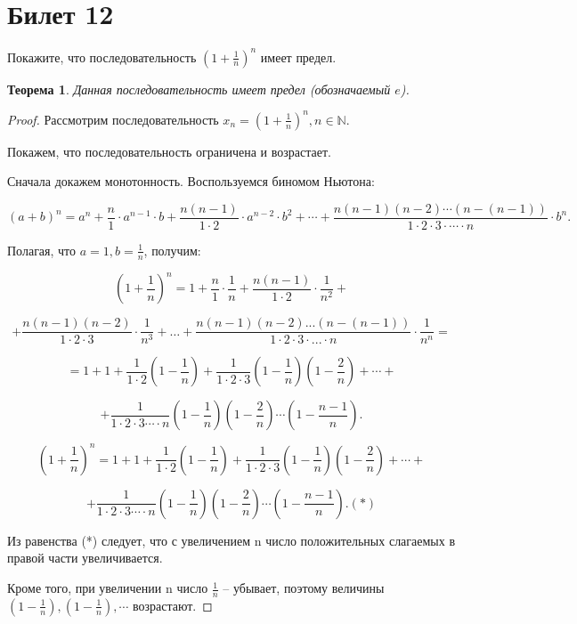 \documentclass[a4paper,12pt]{article}
\newtheorem*{ther}{Теорема}
\begin{document}
    \section*{Билет 12}

    Покажите, что последовательность $(1 + \frac{1}{n})^n$ имеет предел.

    \begin{ther}
        Данная последовательность имеет предел (обозначаемый $e$).
    \end{ther}

    \begin{proof}
            Рассмотрим последовательность $x_n= (1+\frac{1}{n})^n, n \in \mathbb{N}$.

            Покажем, что последовательность ограничена и возрастает.

            Сначала докажем монотонность. Воспользуемся биномом Ньютона:

            $$(a+b)^n= a^{n}+\frac{n}{1}\cdot a^{n-1}\cdot b+\frac{n (n-1)}{1\cdot 2}\cdot a^{n-2}\cdot b^{2}+ \cdots +\frac{n (n-1) (n-2)\cdots (n- (n-1))}{1\cdot 2\cdot 3\cdot \cdots \cdot n}\cdot b^{n}.$$

            Полагая, что  $a= 1, b= \frac{1}{n}$,  получим:

            $$(1+\frac{1}{n})^{n}= 1+\frac{n}{1}\cdot \frac{1}{n}+\frac{n (n-1)}{1\cdot 2}\cdot \frac{1}{n^{2}}+$$

            $$+\frac{n (n-1) (n-2)}{1\cdot 2\cdot 3}\cdot \frac{1}{n^{3}}+ \ldots + \frac{n (n-1) (n-2)... (n- (n-1))}{1\cdot 2\cdot 3\cdot ...\cdot n}\cdot \frac{1}{n^{n}}= $$

            $$= 1+1+\frac{1}{1\cdot 2} (1-\frac{1}{n})+\frac{1}{1\cdot 2\cdot 3} (1-\frac{1}{n}) (1-\frac{2}{n})+\cdots + $$

            $$+\frac{1}{1\cdot 2\cdot 3\cdots \cdot n} (1-\frac{1}{n}) (1-\frac{2}{n})\cdots (1-\frac{n-1}{n}).$$

            $$(1+\frac{1}{n})^{n}= 1+1+\frac{1}{1\cdot 2} (1-\frac{1}{n})+\frac{1}{1\cdot 2\cdot 3} (1-\frac{1}{n}) (1-\frac{2}{n})+ \cdots + $$

            $$+ \frac{1}{1\cdot 2\cdot 3\cdots\cdot n} (1-\frac{1}{n}) (1-\frac{2}{n})\cdots (1-\frac{n-1}{n}). (*)$$

            Из равенства (*) следует, что с увеличением n  число положительных слагаемых в правой части увеличивается.

            Кроме того, при увеличении n число $\frac{1}{n}$ – убывает,
            поэтому величины $(1-\frac{1}{n}), (1-\frac{1}{n}), \cdots$ возрастают.


\end{proof}
\end{document}

